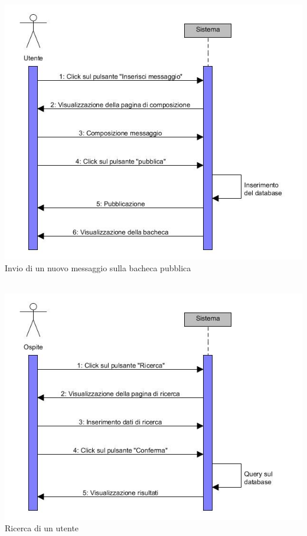 \documentclass[a4paper,12pt]{article}
\begin{document}
\begin{center}
\includegraphics[scale=0.6]{sDiagrams/creazioneThread.jpg} \\
\caption{Invio di un nuovo messaggio sulla bacheca pubblica} \\
\vspace*{\fill}
\includegraphics[scale=0.6]{sDiagrams/ricercaUtenti.jpg} \\
\caption{Ricerca di un utente} \\
\clearpage

\end{center}
\end{document}
